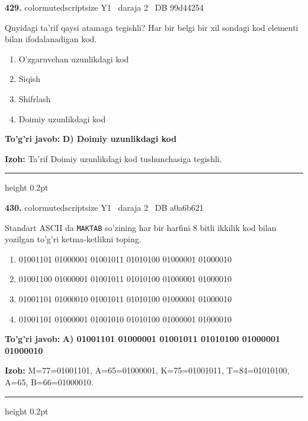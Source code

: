 \documentclass[10pt,a4paper,oneside]{article}
\begin{document}
\noindent\textbf{\color{ink}429.}  {color{muted}scriptsize Y1 \textbullet\ daraja 2 \textbullet\ DB 99d44254}
\par
Quyidagi ta'rif qaysi atamaga tegishli? Har bir belgi bir xil sondagi kod elementi bilan ifodalanadigan kod.
\begin{enumerate}[label=\Alph*),leftmargin=9mm]
\item O'zgaruvchan uzunlikdagi kod
\item Siqish
\item Shifrlash
\item Doimiy uzunlikdagi kod
\end{enumerate}
\begin{tcolorbox}[enhanced,breakable,colback=teal!4,colframe=teal!50!black,boxrule=0.5pt,arc=1.1mm,left=3mm,right=3mm,top=1.7mm,bottom=1.7mm,before skip=2mm,after skip=2mm]
\textbf{\color{teal}To'g'ri javob:} \textbf{D) Doimiy uzunlikdagi kod}
\par\smallskip
\textbf{Izoh:} Ta'rif Doimiy uzunlikdagi kod tushunchasiga tegishli.
\end{tcolorbox}
\vspace{2mm}\hrule height 0.2pt \vspace{3mm}

\noindent\textbf{\color{ink}430.}  {color{muted}scriptsize Y1 \textbullet\ daraja 2 \textbullet\ DB a0a6b621}
\par
Standart ASCII da \texttt{MAKTAB} so'zining har bir harfini 8 bitli ikkilik kod bilan yozilgan to'g'ri ketma-ketlikni toping.
\begin{enumerate}[label=\Alph*),leftmargin=9mm]
\item 01001101 01000001 01001011 01010100 01000001 01000010
\item 01001100 01000001 01001011 01010100 01000001 01000010
\item 01001101 01000010 01001011 01010100 01000001 01000010
\item 01001101 01000001 01001010 01010100 01000001 01000010
\end{enumerate}
\begin{tcolorbox}[enhanced,breakable,colback=teal!4,colframe=teal!50!black,boxrule=0.5pt,arc=1.1mm,left=3mm,right=3mm,top=1.7mm,bottom=1.7mm,before skip=2mm,after skip=2mm]
\textbf{\color{teal}To'g'ri javob:} \textbf{A) 01001101 01000001 01001011 01010100 01000001 01000010}
\par\smallskip
\textbf{Izoh:} M=77=01001101, A=65=01000001, K=75=01001011, T=84=01010100, A=65, B=66=01000010.
\end{tcolorbox}
\vspace{2mm}\hrule height 0.2pt \vspace{3mm}
\end{document}
